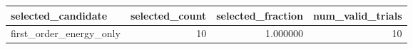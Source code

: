 \begin{tabular}{lrrr}
\toprule
selected_candidate & selected_count & selected_fraction & num_valid_trials \\
\midrule
first_order_energy_only & 10 & 1.000000 & 10 \\
\bottomrule
\end{tabular}
